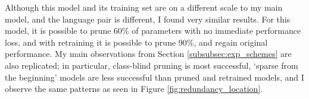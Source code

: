 Although this model and its training set are on a different scale to my main model, 
and the language pair is different, 
I found very similar results. 
For this model, it is possible to prune 60\% of parameters with no immediate performance loss,
and with retraining it is possible to prune 90\%, and regain original performance.
My main observations from Section \ref{subsubsec:exp_schemes} %
are also replicated; in particular, class-blind pruning is most successful,
`sparse from the beginning' models are less successful than pruned and retrained models,
and I observe the same patterns as seen in Figure \ref{fig:redundancy_location}.



